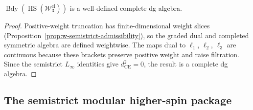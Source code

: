 \begin{proposition}
\label{prop:w-boundary-model-well-defined}
$\operatorname{Bdy}(\operatorname{HS}(\mathcal{W}_3^{\mathrm{cl}}))$
is a well-defined complete dg algebra.
\end{proposition}

\begin{proof}
Positive-weight truncation has finite-dimensional weight slices
(Proposition~\ref{prop:w-semistrict-admissibility}), so the graded
dual and completed symmetric algebra are defined weightwise.  The maps
dual to $\ell_1$, $\ell_2$, $\ell_3$ are continuous because these
brackets preserve positive weight and raise filtration.  Since the
semistrict $L_\infty$ identities give $d_{\mathrm{CE}}^2 = 0$, the
result is a complete dg algebra.
\end{proof}

\subsection{The semistrict modular higher-spin package}
\label{subsec:semistrict-package}


